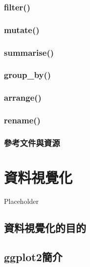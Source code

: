 \documentclass[
]{book}
\begin{document}
\hypertarget{filter}{%
\subsection{filter()}\label{filter}}

\hypertarget{mutate}{%
\subsection{mutate()}\label{mutate}}

\hypertarget{summarise}{%
\subsection{summarise()}\label{summarise}}

\hypertarget{group_by}{%
\subsection{group\_by()}\label{group_by}}

\hypertarget{arrange}{%
\subsection{arrange()}\label{arrange}}

\hypertarget{rename}{%
\subsection{rename()}\label{rename}}

\hypertarget{ux53c3ux8003ux6587ux4ef6ux8207ux8cc7ux6e90-1}{%
\subsection{參考文件與資源}\label{ux53c3ux8003ux6587ux4ef6ux8207ux8cc7ux6e90-1}}

\hypertarget{vis}{%
\chapter{資料視覺化}\label{vis}}

Placeholder

\hypertarget{ux8cc7ux6599ux8996ux89baux5316ux7684ux76eeux7684}{%
\section{資料視覺化的目的}\label{ux8cc7ux6599ux8996ux89baux5316ux7684ux76eeux7684}}

\hypertarget{ggplot2ux7c21ux4ecb}{%
\section{ggplot2簡介}\label{ggplot2ux7c21ux4ecb}}
\end{document}
